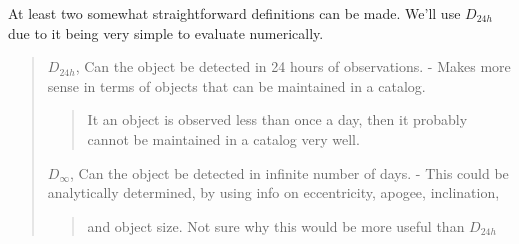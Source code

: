 \documentclass[letterpaper,10pt,english]{sphinxmanual}
\begin{document}
At least two somewhat straightforward definitions can be made.
We’ll use \(D_{24h}\) due to it being very simple to evaluate numerically.
\begin{quote}

\(D_{24h}\), Can the object be detected in 24 hours of observations.
- Makes more sense in terms of objects that can be maintained in a catalog.
\begin{quote}

It an object is observed less than once a day, then it probably cannot be
maintained in a catalog very well.
\end{quote}

\(D_{\infty}\), Can the object be detected in infinite number of days.
- This could be analytically determined, by using info on eccentricity, apogee, inclination,
\begin{quote}

and object size. Not sure why this would be more useful than \(D_{24h}\)
\end{quote}
\end{quote}
\end{document}
